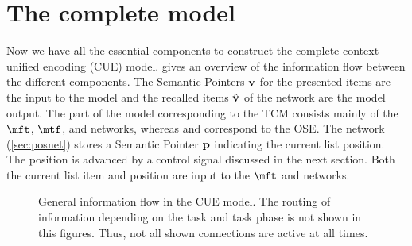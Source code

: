 \chapter{The complete model}

Now we have all the essential components to construct the complete context-unified encoding (CUE) model.
 gives an overview of the information flow between the different components.
The Semantic Pointers $\mathbf{v}$ for the presented items are the input to the model and the recalled items $\hat{\mathbf{v}}$ of the  network are the model output.
The part of the model corresponding to the TCM consists mainly of the $\mft$, $\mtf$, and  networks, whereas  and  correspond to the OSE\@.
The  network (\cref{sec:posnet}) stores a Semantic Pointer $\mathbf{p}$ indicating the current list position.
The position is advanced by a control signal discussed in the next section.
Both the current list item and position are input to the $\mft$ and  networks.
\begin{figure}
    \centering
    \caption[General information flow in the CUE model]{General information flow in the CUE model. The routing of information depending on the task and task phase is not shown in this figures. Thus, not all shown connections are active at all times.}\label{fig:general-routing}
\end{figure}

